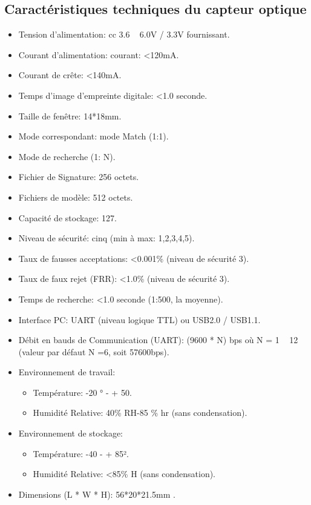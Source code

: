 \subsection{Caractéristiques techniques du capteur optique}
\begin{itemize}
    \item Tension d'alimentation: cc 3.6 ~ 6.0V / 3.3V fournissant.
    \item Courant d'alimentation: courant: <120mA.
    \item Courant de crête: <140mA.
    \item Temps d'image d'empreinte digitale: <1.0 seconde.
    \item Taille de fenêtre: 14*18mm.
    \item Mode correspondant: mode Match (1:1).
    \item Mode de recherche (1: N).
    \item Fichier de Signature: 256 octets.
    \item Fichiers de modèle: 512 octets.
    \item Capacité de stockage: 127.
    \item Niveau de sécurité: cinq (min à max: 1,2,3,4,5).
    \item Taux  de fausses acceptations: <0.001\% (niveau de sécurité 3).
    \item Taux de faux rejet (FRR): <1.0\% (niveau de sécurité 3).
    \item Temps de recherche: <1.0 seconde (1:500, la moyenne).
    \item Interface PC: UART (niveau logique TTL) ou USB2.0 / USB1.1.
    \item Débit en bauds de Communication (UART): (9600 * N) bps où N = 1 ~ 12 
        (valeur par défaut N =6, soit 57600bps).
    \item Environnement de travail:
        \begin{itemize}
            \item [\textbullet]Température: -20 ° - + 50.
            \item [\textbullet]Humidité Relative: 40\% RH-85 \% hr (sans condensation).
        \end{itemize}
    \item Environnement de stockage:
        \begin{itemize}
            \item [\textbullet] Température: -40 - + 85².
            \item [\textbullet] Humidité Relative: <85\% H (sans condensation).
        \end{itemize}
    \item Dimensions (L * W * H): 56*20*21.5mm .
\end{itemize}

